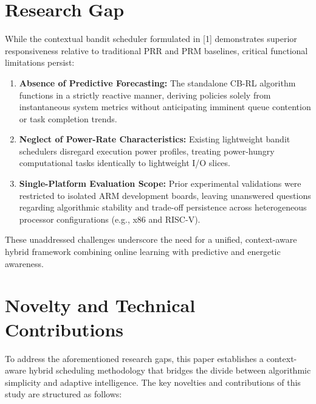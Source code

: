 \documentclass[conference]{IEEEtran}
\begin{document}
\section{Research Gap}
While the contextual bandit scheduler formulated in [1] demonstrates superior responsiveness relative to traditional PRR and PRM baselines, critical functional limitations persist:
\begin{enumerate}
    \item \textbf{Absence of Predictive Forecasting:} The standalone CB-RL algorithm functions in a strictly reactive manner, deriving policies solely from instantaneous system metrics without anticipating imminent queue contention or task completion trends.
    \item \textbf{Neglect of Power-Rate Characteristics:} Existing lightweight bandit schedulers disregard execution power profiles, treating power-hungry computational tasks identically to lightweight I/O slices.
    \item \textbf{Single-Platform Evaluation Scope:} Prior experimental validations were restricted to isolated ARM development boards, leaving unanswered questions regarding algorithmic stability and trade-off persistence across heterogeneous processor configurations (e.g., x86 and RISC-V).
\end{enumerate}
These unaddressed challenges underscore the need for a unified, context-aware hybrid framework combining online learning with predictive and energetic awareness.

\section{Novelty and Technical Contributions}
To address the aforementioned research gaps, this paper establishes a context-aware hybrid scheduling methodology that bridges the divide between algorithmic simplicity and adaptive intelligence. The key novelties and contributions of this study are structured as follows:
\end{document}
